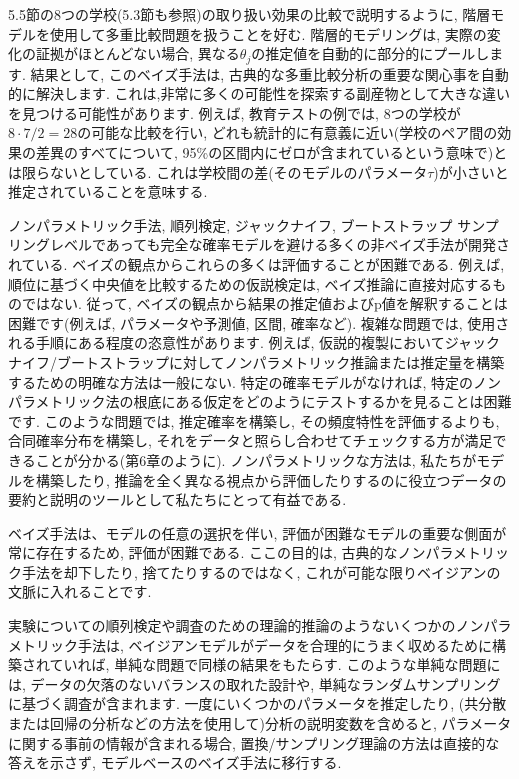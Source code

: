 \documentclass[10pt,dvipdfmx,a4]{beamer}
\begin{document}

\begin{frame}
5.5節の8つの学校(5.3節も参照)の取り扱い効果の比較で説明するように, 階層モデルを使用して多重比較問題を扱うことを好む.
階層的モデリングは, 実際の変化の証拠がほとんどない場合, 異なる$\theta_j$の推定値を自動的に部分的にプールします.
結果として, このベイズ手法は, 古典的な多重比較分析の重要な関心事を自動的に解決します.
これは,非常に多くの可能性を探索する副産物として大きな違いを見つける可能性があります.
例えば, 教育テストの例では, 8つの学校が$8\cdot 7/2=28$の可能な比較を行い, どれも統計的に有意義に近い(学校のペア間の効果の差異のすべてについて, 95\%の区間内にゼロが含まれているという意味で)とは限らないとしている.
これは学校間の差(そのモデルのパラメータ$\tau$)が小さいと推定されていることを意味する.

\end{frame}


\begin{frame}{ノンパラメトリック手法, 順列検定, ジャックナイフ, ブートストラップ}
サンプリングレベルであっても完全な確率モデルを避ける多くの非ベイズ手法が開発されている.
ベイズの観点からこれらの多くは評価することが困難である.
例えば, 順位に基づく中央値を比較するための仮説検定は, ベイズ推論に直接対応するものではない.
従って, ベイズの観点から結果の推定値およびp値を解釈することは困難です(例えば, パラメータや予測値, 区間, 確率など).
複雑な問題では, 使用される手順にある程度の恣意性があります.
例えば, 仮説的複製においてジャックナイフ/ブートストラップに対してノンパラメトリック推論または推定量を構築するための明確な方法は一般にない.
特定の確率モデルがなければ, 特定のノンパラメトリック法の根底にある仮定をどのようにテストするかを見ることは困難です.
このような問題では, 推定確率を構築し, その頻度特性を評価するよりも, 合同確率分布を構築し, それをデータと照らし合わせてチェックする方が満足できることが分かる(第6章のように).
ノンパラメトリックな方法は, 私たちがモデルを構築したり, 推論を全く異なる視点から評価したりするのに役立つデータの要約と説明のツールとして私たちにとって有益である.
\end{frame}


\begin{frame}
ベイズ手法は、モデルの任意の選択を伴い, 評価が困難なモデルの重要な側面が常に存在するため, 評価が困難である.
ここの目的は, 古典的なノンパラメトリック手法を却下したり, 捨てたりするのではなく, これが可能な限りベイジアンの文脈に入れることです.

実験についての順列検定や調査のための理論的推論のようないくつかのノンパラメトリック手法は, ベイジアンモデルがデータを合理的にうまく収めるために構築されていれば, 単純な問題で同様の結果をもたらす.
このような単純な問題には, データの欠落のないバランスの取れた設計や, 単純なランダムサンプリングに基づく調査が含まれます.
一度にいくつかのパラメータを推定したり, (共分散または回帰の分析などの方法を使用して)分析の説明変数を含めると, パラメータに関する事前の情報が含まれる場合, 置換/サンプリング理論の方法は直接的な答えを示さず, モデルベースのベイズ手法に移行する.
\end{frame}
\end{document}
